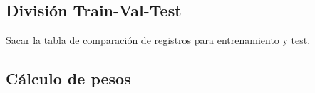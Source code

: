 \documentclass{uathesis-es}
\begin{document}
{\subsection{División Train-Val-Test}

Sacar la tabla de comparación de registros para entrenamiento y test.

\subsection{Cálculo de pesos}



}
\end{document}
